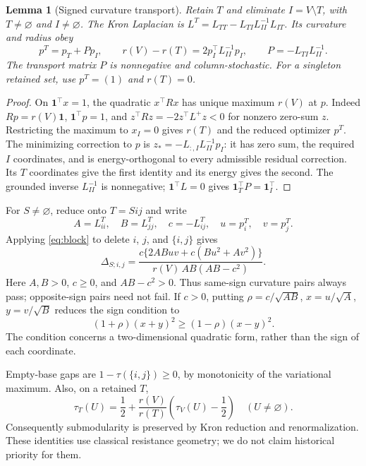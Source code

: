 \documentclass[11pt,a4paper]{article}
\newtheorem{lemma}[theorem]{Lemma}
\newcommand{\one}{\boldsymbol1}
\newcommand{\Del}{\Delta}
\begin{document}
\begin{lemma}[Signed curvature transport]\label{lem:block}
Retain $T$ and eliminate $I=V\setminus T$, with $T\ne\varnothing$ and $I\ne\varnothing$. The Kron Laplacian is
$L^T=L_{TT}-L_{TI}L_{II}^{-1}L_{IT}$. Its curvature and radius obey
\begin{equation}\label{eq:block}
\boxed{\quad
p^T=p_T+Pp_I,\qquad
r(V)-r(T)=2p_I^\top L_{II}^{-1}p_I,\qquad
P=-L_{TI}L_{II}^{-1}.
\quad}
\end{equation}
The transport matrix $P$ is nonnegative and column-stochastic. For a singleton retained set, use $p^T=(1)$ and $r(T)=0$.
\end{lemma}
\begin{proof}
On $\one^\top x=1$, the quadratic $x^\top Rx$ has unique maximum $r(V)$ at $p$. Indeed $Rp=r(V)\one$, $\one^\top p=1$, and
$z^\top Rz=-2z^\top L^+z<0$ for nonzero zero-sum $z$.
Restricting the maximum to $x_I=0$ gives $r(T)$ and the reduced optimizer $p^T$. The minimizing correction to $p$ is
$z_*=-L_{:,I}L_{II}^{-1}p_I$:
it has zero sum, the required $I$ coordinates, and is energy-orthogonal to every admissible residual correction. Its $T$ coordinates give the first identity and its energy gives the second. The grounded inverse $L_{II}^{-1}$ is nonnegative; $\one^\top L=0$ gives $\one_T^\top P=\one_I^\top$.
\end{proof}

For $S\ne\varnothing$, reduce onto $T=Sij$ and write
\[
A=L^T_{ii},\quad B=L^T_{jj},\quad c=-L^T_{ij},\quad u=p_i^T,\quad v=p_j^T.
\]
Applying \eqref{eq:block} to delete $i$, $j$, and $\{i,j\}$ gives
\begin{equation}\label{eq:pair}
\boxed{\quad
\Del_{S;i,j}=
\frac{c\{2ABuv+c(Bu^2+Av^2)\}}
{r(V)\,AB(AB-c^2)}.
\quad}
\end{equation}
Here $A,B>0$, $c\ge0$, and $AB-c^2>0$. Thus same-sign curvature pairs always pass; opposite-sign pairs need not fail. If $c>0$, putting $\rho=c/\sqrt{AB}$, $x=u/\sqrt A$, $y=v/\sqrt B$ reduces the sign condition to
\[
(1+\rho)(x+y)^2\ge(1-\rho)(x-y)^2.
\]
The condition concerns a two-dimensional quadratic form, rather than the sign of each coordinate.

Empty-base gaps are $1-\tau(\{i,j\})\ge0$, by monotonicity of the variational maximum. Also, on a retained $T$,
\[
\tau_T(U)=\frac12+\frac{r(V)}{r(T)}\left(\tau_V(U)-\frac12\right)\quad(U\ne\varnothing).
\]
Consequently submodularity is preserved by Kron reduction and renormalization. These identities use classical resistance geometry; we do not claim historical priority for them.
\end{document}
